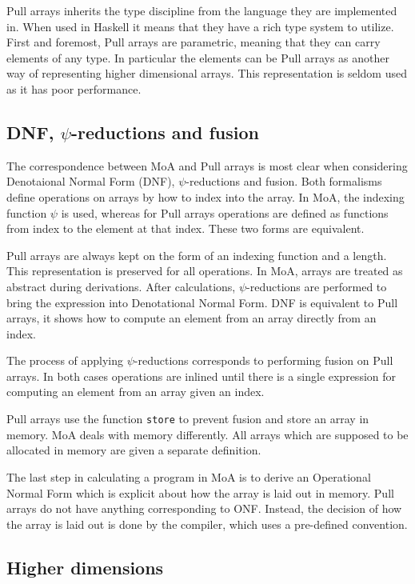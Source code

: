 \documentclass{sigplanconf}
\begin{document}
Pull arrays inherits the type discipline from the language they are
implemented in. When used in Haskell it means that they have a rich
type system to utilize. First and foremost, Pull arrays are
parametric, meaning that they can carry elements of any type. In
particular the elements can be Pull arrays as another way of
representing higher dimensional arrays. This representation is seldom
used as it has poor performance.

\subsection{DNF, \(\psi\)-reductions and fusion}
\label{sec:normalization}

The correspondence between MoA and Pull arrays is most clear when
considering Denotaional Normal Form (DNF), \(\psi\)-reductions and
fusion. Both formalisms define operations on arrays by how to index
into the array. In MoA, the indexing function \(\psi\) is used,
whereas for Pull arrays operations are defined as functions from index
to the element at that index. These two forms are equivalent.

Pull arrays are always kept on the form of an indexing function and a
length. This representation is preserved for all operations. In MoA,
arrays are treated as abstract during derivations. After calculations,
\(\psi\)-reductions are performed to bring the expression into
Denotational Normal Form. DNF is equivalent to Pull arrays, it shows
how to compute an element from an array directly from an index.

The process of applying \(\psi\)-reductions corresponds to performing
fusion on Pull arrays. In both cases operations are inlined until
there is a single expression for computing an element from an array
given an index.

Pull arrays use the function \verb!store! to prevent fusion and store
an array in memory. MoA deals with memory differently. All arrays
which are supposed to be allocated in memory are given a separate
definition.

The last step in calculating a program in MoA is to derive an
Operational Normal Form which is explicit about how the array is laid
out in memory. Pull arrays do not have anything corresponding to
ONF. Instead, the decision of how the array is laid out is done by the
compiler, which uses a pre-defined convention.

\subsection{Higher dimensions}
\label{sec:highdim}
\end{document}
